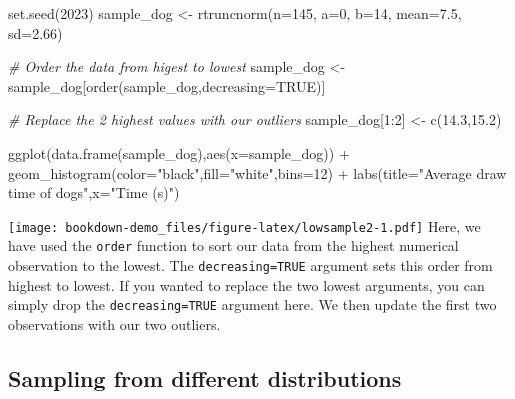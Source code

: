 \documentclass[
]{book}
\newenvironment{Shaded}{\begin{snugshade}}{\end{snugshade}}
\newcommand{\AttributeTok}[1]{\textcolor[rgb]{0.77,0.63,0.00}{#1}}
\newcommand{\CommentTok}[1]{\textcolor[rgb]{0.56,0.35,0.01}{\textit{#1}}}
\newcommand{\ConstantTok}[1]{\textcolor[rgb]{0.00,0.00,0.00}{#1}}
\newcommand{\DecValTok}[1]{\textcolor[rgb]{0.00,0.00,0.81}{#1}}
\newcommand{\FloatTok}[1]{\textcolor[rgb]{0.00,0.00,0.81}{#1}}
\newcommand{\FunctionTok}[1]{\textcolor[rgb]{0.00,0.00,0.00}{#1}}
\newcommand{\NormalTok}[1]{#1}
\newcommand{\OtherTok}[1]{\textcolor[rgb]{0.56,0.35,0.01}{#1}}
\newcommand{\SpecialCharTok}[1]{\textcolor[rgb]{0.00,0.00,0.00}{#1}}
\newcommand{\StringTok}[1]{\textcolor[rgb]{0.31,0.60,0.02}{#1}}
\begin{document}
\begin{Shaded}
\begin{Highlighting}[]
\FunctionTok{set.seed}\NormalTok{(}\DecValTok{2023}\NormalTok{)}
\NormalTok{sample\_dog }\OtherTok{\textless{}{-}} \FunctionTok{rtruncnorm}\NormalTok{(}\AttributeTok{n=}\DecValTok{145}\NormalTok{, }\AttributeTok{a=}\DecValTok{0}\NormalTok{, }\AttributeTok{b=}\DecValTok{14}\NormalTok{, }\AttributeTok{mean=}\FloatTok{7.5}\NormalTok{, }\AttributeTok{sd=}\FloatTok{2.66}\NormalTok{)}

\CommentTok{\# Order the data from higest to lowest}
\NormalTok{sample\_dog }\OtherTok{\textless{}{-}}\NormalTok{ sample\_dog[}\FunctionTok{order}\NormalTok{(sample\_dog,}\AttributeTok{decreasing=}\ConstantTok{TRUE}\NormalTok{)]}

\CommentTok{\# Replace the 2 highest values with our outliers}
\NormalTok{sample\_dog[}\DecValTok{1}\SpecialCharTok{:}\DecValTok{2}\NormalTok{] }\OtherTok{\textless{}{-}} \FunctionTok{c}\NormalTok{(}\FloatTok{14.3}\NormalTok{,}\FloatTok{15.2}\NormalTok{)}

\FunctionTok{ggplot}\NormalTok{(}\FunctionTok{data.frame}\NormalTok{(sample\_dog),}\FunctionTok{aes}\NormalTok{(}\AttributeTok{x=}\NormalTok{sample\_dog)) }\SpecialCharTok{+} \FunctionTok{geom\_histogram}\NormalTok{(}\AttributeTok{color=}\StringTok{"black"}\NormalTok{,}\AttributeTok{fill=}\StringTok{"white"}\NormalTok{,}\AttributeTok{bins=}\DecValTok{12}\NormalTok{) }\SpecialCharTok{+} 
            \FunctionTok{labs}\NormalTok{(}\AttributeTok{title=}\StringTok{"Average draw time of dogs"}\NormalTok{,}\AttributeTok{x=}\StringTok{"Time (s)"}\NormalTok{)}
\end{Highlighting}
\end{Shaded}

\texttt{[image: bookdown-demo\_files/figure-latex/lowsample2-1.pdf]}
Here, we have used the \texttt{order} function to sort our data from the highest numerical observation to the lowest. The \texttt{decreasing=TRUE} argument sets this order from highest to lowest. If you wanted to replace the two lowest arguments, you can simply drop the \texttt{decreasing=TRUE} argument here. We then update the first two observations with our two outliers.

\hypertarget{sampling-from-different-distributions}{%
\subsection{Sampling from different distributions}\label{sampling-from-different-distributions}}
\end{document}
